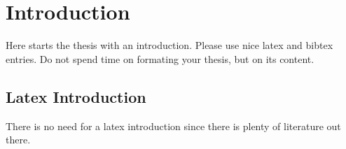\chapter{Introduction}
\label{chapter:introduction}



Here starts the thesis with an introduction. Please use nice latex and bibtex entries. Do not spend time on formating your thesis, but on its content. 
 
\section{Latex Introduction}
There is no need for a latex introduction since there is plenty of literature out there.
 


